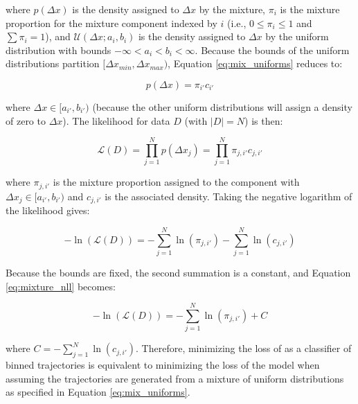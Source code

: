 \noindent
where $p(\Delta x)$ is the density assigned to $\Delta x$ by the mixture, $\pi_{i}$ is the mixture proportion for the mixture component indexed by $i$ (i.e., $0 \leq \pi_{i} \leq 1$ and $\sum \pi_{i} = 1$), and $\mathcal{U}(\Delta x; a_{i}, b_{i})$ is the density assigned to $\Delta x$ by the uniform distribution with bounds $-\infty < a_{i} < b_{i} < \infty$.
Because the bounds of the uniform distributions partition $[\Delta x_{min}, \Delta x_{max})$, Equation \eqref{eq:mix_uniforms} reduces to:

\[
    p(\Delta x) = \pi_{i'} c_{i'}
\]

\noindent
where $\Delta x \in [a_{i'}, b_{i'})$ (because the other uniform distributions will assign a density of zero to $\Delta x$).
The likelihood for data $D$ (with $|D| = N$) is then:

\[
    \mathcal{L}(D) = \prod_{j=1}^{N} p(\Delta x_{j}) = \prod_{j=1}^{N} \pi_{j,i'} c_{j,i'}
\]

\noindent
where $\pi_{j,i'}$ is the mixture proportion assigned to the component with  $\Delta x_{j} \in [a_{i'}, b_{i'})$ and $c_{j,i'}$ is the associated density.
Taking the negative logarithm of the likelihood gives:

\begin{equation}\label{eq:mixture_nll}
    -\ln(\mathcal{L}(D)) = -\sum_{j=1}^{N} \ln(\pi_{j,i'}) -\sum_{j=1}^{N} \ln(c_{j,i'})
\end{equation}

\noindent
Because the bounds are fixed, the second summation is a constant, and Equation \eqref{eq:mixture_nll} becomes:

\[
    -\ln(\mathcal{L}(D)) = -\sum_{j=1}^{N} \ln(\pi_{j,i'}) + C
\]

\noindent
where $C = -\sum_{j=1}^{N} \ln(c_{j,i'})$.
Therefore, minimizing the loss of \btv{} as a classifier of binned trajectories is equivalent to minimizing the loss of the model when assuming the trajectories are generated from a mixture of uniform distributions as specified in Equation \eqref{eq:mix_uniforms}.